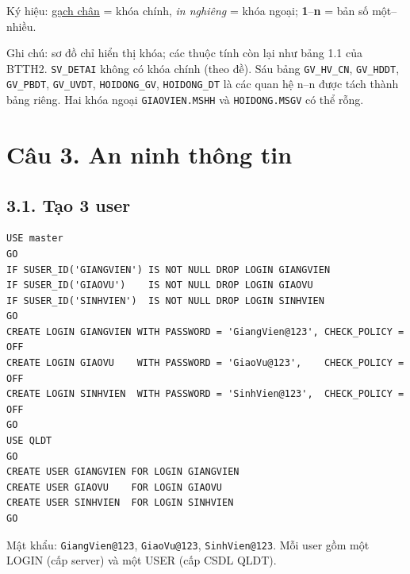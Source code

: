 \documentclass[12pt,a4paper]{article}
\begin{document}
\begin{landscape}

\vspace{4pt}
{\footnotesize Ký hiệu: \underline{gạch chân} = khóa chính, \textit{in nghiêng} = khóa ngoại; \textbf{1}--\textbf{n} = bản số một--nhiều.}
\end{landscape}

\noindent Ghi chú: sơ đồ chỉ hiển thị khóa; các thuộc tính còn lại như bảng 1.1 của BTTH2. \texttt{SV\_DETAI} không có khóa chính (theo đề). Sáu bảng \texttt{GV\_HV\_CN}, \texttt{GV\_HDDT}, \texttt{GV\_PBDT}, \texttt{GV\_UVDT}, \texttt{HOIDONG\_GV}, \texttt{HOIDONG\_DT} là các quan hệ n--n được tách thành bảng riêng. Hai khóa ngoại \texttt{GIAOVIEN.MSHH} và \texttt{HOIDONG.MSGV} có thể rỗng.

\section*{Câu 3. An ninh thông tin}
\subsection*{3.1. Tạo 3 user}
\begin{lstlisting}
USE master
GO
IF SUSER_ID('GIANGVIEN') IS NOT NULL DROP LOGIN GIANGVIEN
IF SUSER_ID('GIAOVU')    IS NOT NULL DROP LOGIN GIAOVU
IF SUSER_ID('SINHVIEN')  IS NOT NULL DROP LOGIN SINHVIEN
GO
CREATE LOGIN GIANGVIEN WITH PASSWORD = 'GiangVien@123', CHECK_POLICY = OFF
CREATE LOGIN GIAOVU    WITH PASSWORD = 'GiaoVu@123',    CHECK_POLICY = OFF
CREATE LOGIN SINHVIEN  WITH PASSWORD = 'SinhVien@123',  CHECK_POLICY = OFF
GO
USE QLDT
GO
CREATE USER GIANGVIEN FOR LOGIN GIANGVIEN
CREATE USER GIAOVU    FOR LOGIN GIAOVU
CREATE USER SINHVIEN  FOR LOGIN SINHVIEN
GO
\end{lstlisting}
Mật khẩu: \texttt{GiangVien@123}, \texttt{GiaoVu@123}, \texttt{SinhVien@123}. Mỗi user gồm một LOGIN (cấp server) và một USER (cấp CSDL QLDT).
\end{document}
